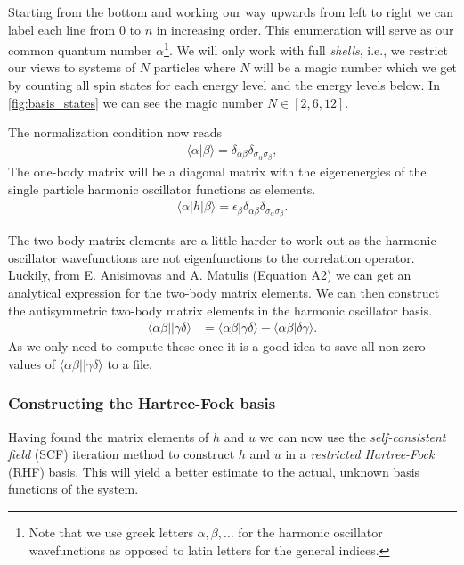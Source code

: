 \documentclass[
    a4paper, aps, twocolumn, floatfix, superscriptaddress,
    nofootinbib]{revtex4-1}
\newcommand{\1}{\mathds{1}}
\newcommand{\bra}[1]{\langle #1\lvert}
\newcommand{\ket}[1]{\rvert #1\rangle}
\newcommand{\braket}[2]{\langle #1 \vert #2 \rangle}
\begin{document}
            Starting from the bottom and working our way upwards from left to
            right we can label each line from $0$ to $n$ in increasing
            order. This enumeration will serve as our common quantum number
            $\alpha$\footnote{Note that we use greek letters $\alpha, \beta,
            \dots$ for the harmonic oscillator wavefunctions as opposed to latin
            letters for the general indices.}. We will only work with full
            \emph{shells}, i.e., we restrict our views to systems of $N$
            particles where $N$ will be a magic number which we get by counting
            all spin states for each energy level and the energy levels below.
            In \autoref{fig:basis_states} we can see the magic number $N \in [2,
            6, 12]$.

            The normalization condition now reads
            \begin{align}
                \braket{\alpha}{\beta}
                = \delta_{\alpha\beta}\delta_{\sigma_\alpha\sigma_\beta},
            \end{align}
            The one-body matrix will be a diagonal matrix with the eigenenergies
            of the single particle harmonic oscillator functions as elements.
            \begin{align}
                \bra{\alpha}h\ket{\beta}
                = \epsilon_{\beta}
                \delta_{\alpha\beta}\delta_{\sigma_\alpha\sigma_\beta}.
            \end{align}

            The two-body matrix elements are a little harder to work out as the
            harmonic oscillator wavefunctions are not eigenfunctions to the
            correlation operator. Luckily, from E. Anisimovas and A.  Matulis
            (Equation A2)\cite{anisimovas1998energy} we can get an analytical
            expression for the two-body matrix elements. We can then construct
            the antisymmetric two-body matrix elements in the harmonic
            oscillator basis.
            \begin{align}
                \bra{\alpha\beta}\ket{\gamma\delta}
                &= \braket{\alpha\beta}{\gamma\delta}
                - \braket{\alpha\beta}{\delta\gamma}.
            \end{align}
            As we only need to compute these once it is a good idea to save all
            non-zero values of $\bra{\alpha\beta}\ket{\gamma\delta}$ to a file.

        \subsubsection{Constructing the Hartree-Fock basis}
            Having found the matrix elements of $h$ and $u$ we can now use the
            \emph{self-consistent field} (SCF) iteration method to construct $h$ and
            $u$ in a \emph{restricted Hartree-Fock} (RHF) basis. This will yield a
            better estimate to the actual, unknown basis functions of the
            system.
\end{document}
